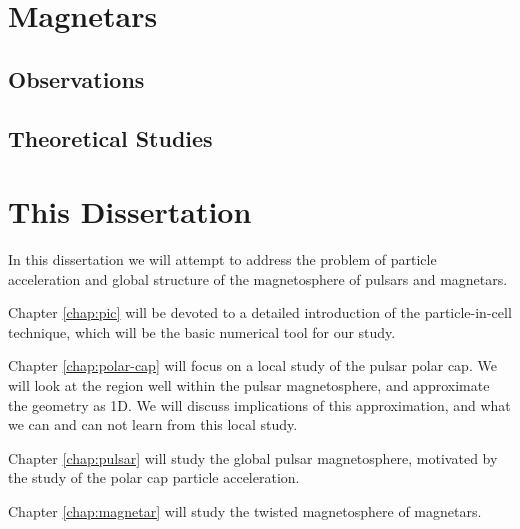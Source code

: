 
\section{Magnetars}
\label{sec:intro-magnetars}


\subsection{Observations}
\label{sec:intro-magnetar-observation}

\subsection{Theoretical Studies}
\label{sec:intro-magnetar-theory}


\section{This Dissertation}
\label{sec:intro-outline}

In this dissertation we will attempt to address the problem of particle
acceleration and global structure of the magnetosphere of pulsars and
magnetars.

Chapter \ref{chap:pic} will be devoted to a detailed introduction of the
particle-in-cell technique, which will be the basic numerical tool for our
study.

Chapter \ref{chap:polar-cap} will focus on a local study of the pulsar
polar cap. We will look at the region well within the pulsar magnetosphere, and
approximate the geometry as 1D. We will discuss implications of this
approximation, and what we can and can not learn from this local study.

Chapter \ref{chap:pulsar} will study the global pulsar magnetosphere, motivated
by the study of the polar cap particle acceleration.

Chapter \ref{chap:magnetar} will study the twisted magnetosphere of magnetars.

